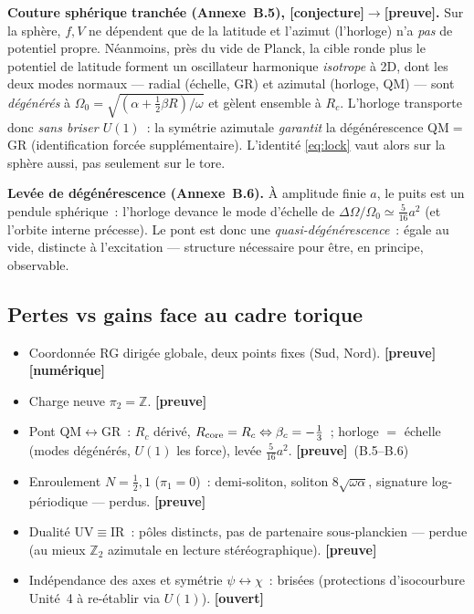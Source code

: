 \documentclass[11pt]{article}
\newcommand{\preuve}{{\small\textbf{[preuve]}}}
\newcommand{\num}{{\small\textbf{[num\'erique]}}}
\newcommand{\conj}{{\small\textbf{[conjecture]}}}
\newcommand{\ouv}{{\small\textbf{[ouvert]}}}
\theoremstyle{definition}
\begin{document}
\textbf{Couture sph\'erique tranch\'ee (Annexe~B.5), \conj$\to$\preuve.} Sur la sph\`ere, $f,V$ ne
d\'ependent que de la latitude et l'azimut (l'horloge) n'a \emph{pas} de potentiel propre. N\'eanmoins,
pr\`es du vide de Planck, la cible ronde plus le potentiel de latitude forment un oscillateur harmonique
\emph{isotrope} \`a 2D, dont les deux modes normaux --- radial (\'echelle, GR) et azimutal (horloge, QM)
--- sont \emph{d\'eg\'en\'er\'es} \`a $\Omega_0=\sqrt{(\alpha+\tfrac12\beta R)/\omega}$ et g\`elent
ensemble \`a $R_c$. L'horloge transporte donc \emph{sans briser $U(1)$}~: la sym\'etrie azimutale
\emph{garantit} la d\'eg\'en\'erescence QM$=$GR (identification forc\'ee suppl\'ementaire). L'identit\'e
\eqref{eq:lock} vaut alors sur la sph\`ere aussi, pas seulement sur le tore.

\textbf{Lev\'ee de d\'eg\'en\'erescence (Annexe~B.6).} \`A amplitude finie $a$, le puits est un pendule
sph\'erique~: l'horloge devance le mode d'\'echelle de $\Delta\Omega/\Omega_0\simeq\tfrac{5}{16}a^2$ (et
l'orbite interne pr\'ecesse). Le pont est donc une \emph{quasi-d\'eg\'en\'erescence}~: \'egale au vide,
distincte \`a l'excitation --- structure n\'ecessaire pour \^etre, en principe, observable.

\subsection{Pertes vs gains face au cadre torique}\label{sec:pertes}
\begin{itemize}[nosep,leftmargin=1.4em]
\item[$\oplus$] Coordonn\'ee RG dirig\'ee globale, deux points fixes (Sud, Nord). \preuve\num
\item[$\oplus$] Charge neuve $\pi_2=\mathbb{Z}$. \preuve
\item[$\oplus$] Pont QM$\leftrightarrow$GR~: $R_c$ d\'eriv\'e, $R_{\rm core}=R_c\Leftrightarrow\beta_c=-\tfrac13$~; horloge $=$ \'echelle (modes d\'eg\'en\'er\'es, $U(1)$ les force), lev\'ee $\tfrac{5}{16}a^2$. \preuve\ (B.5--B.6)
\item[$\ominus$] Enroulement $N=\tfrac12,1$ ($\pi_1=0$)~: demi-soliton, soliton $8\sqrt{\omega\alpha}$, signature log-p\'eriodique --- perdus. \preuve
\item[$\ominus$] Dualit\'e UV$\equiv$IR~: p\^oles distincts, pas de partenaire sous-planckien --- perdue (au mieux $\mathbb{Z}_2$ azimutale en lecture st\'er\'eographique). \preuve
\item[$\ominus$] Ind\'ependance des axes et sym\'etrie $\psi\!\leftrightarrow\!\chi$~: bris\'ees (protections d'isocourbure Unit\'e~4 \`a re-\'etablir via $U(1)$). \ouv
\end{itemize}
\end{document}
